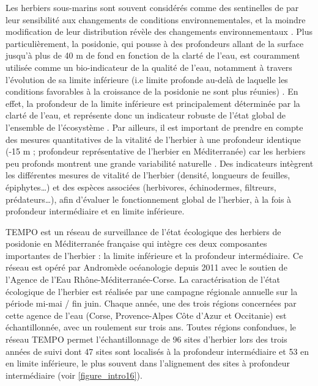 Les herbiers sous-marins sont souvent considérés comme des sentinelles de par leur sensibilité aux changements de conditions environnementales, et la moindre modification de leur distribution révèle des changements environnementaux \citep{orth_global_2006}. Plus particulièrement, la posidonie, qui pousse à des profondeurs allant de la surface jusqu’à plus de 40 m de fond en fonction de la clarté de l’eau, est couramment utilisée comme un bio-indicateur de la qualité de l’eau, notamment à travers l’évolution de sa limite inférieure (i.e limite profonde au-delà de laquelle les conditions favorables à la croissance de la posidonie ne sont plus réunies) \citep{boudouresque_regression_2009, ruiz_mediterranean_2009}. En effet, la profondeur de la limite inférieure est principalement déterminée par la clarté de l’eau, et représente donc un indicateur robuste de l’état global de l’ensemble de l’écosystème \citep{borum_european_2004}. Par ailleurs, il est important de prendre en compte des mesures quantitatives de la vitalité de l’herbier à une profondeur identique (-15 m ; profondeur représentative de l’herbier en Méditerranée) car les herbiers peu profonds montrent une grande variabilité naturelle \citep{marba_interannual_1997, balestri_spatial_2003}. Des indicateurs intègrent les différentes mesures de vitalité de l’herbier (densité, longueurs de feuilles, épiphytes…) et des espèces associées (herbivores, échinodermes, filtreurs, prédateurs…), afin d’évaluer le fonctionnement global de l’herbier, à la fois à profondeur intermédiaire et en limite inférieure. 

TEMPO est un réseau de surveillance de l’état écologique des herbiers de posidonie en Méditerranée française qui intègre ces deux composantes importantes de l’herbier : la limite inférieure et la profondeur intermédiaire. Ce réseau est opéré par Andromède océanologie depuis 2011 avec le soutien de l’Agence de l’Eau Rhône-Méditerranée-Corse. La caractérisation de l’état écologique de l’herbier est réalisée par une campagne régionale annuelle sur la période mi-mai / fin juin. Chaque année, une des trois régions concernées par cette agence de l’eau (Corse, Provence-Alpes Côte d’Azur et Occitanie) est échantillonnée, avec un roulement sur trois ans. Toutes régions confondues, le réseau TEMPO permet l’échantillonnage de 96 sites d’herbier lors des trois années de suivi dont 47 sites sont localisés à la profondeur intermédiaire et 53 en en limite inférieure, le plus souvent dans l’alignement des sites à profondeur intermédiaire (voir \autoref{figure_intro16}). 


